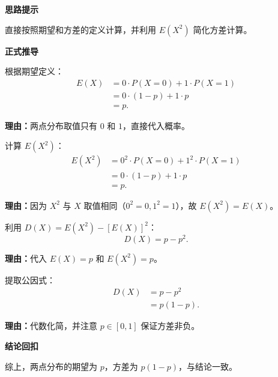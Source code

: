 \begin{proofbox}

	\textbf{\textcolor{CProof}{思路提示}}

	直接按照期望和方差的定义计算，并利用 $E(X^2)$ 简化方差计算。

	\medskip
	\textbf{\textcolor{CProof}{正式推导}}
	\begin{description}[style=nextline, leftmargin=2.8em, labelsep=0.5em, itemsep=0.55em]

		\item[\textbf{步骤一（求期望）：}] 根据期望定义：
			\[
				\begin{aligned}
					E(X) &= 0\cdot P(X=0) + 1\cdot P(X=1) \\
					&= 0\cdot(1-p) + 1\cdot p \\
					&= p.
			\end{aligned}
			\]
			\par\textbf{理由：}两点分布取值只有 $0$ 和 $1$，直接代入概率。

		\item[\textbf{步骤二（求二阶矩）：}] 计算 $E(X^2)$：
			\[
				\begin{aligned}
					E(X^2) &= 0^2\cdot P(X=0) + 1^2\cdot P(X=1) \\
					&= 0\cdot(1-p) + 1\cdot p \\
					&= p.
			\end{aligned}
			\]
			\par\textbf{理由：}因为 $X^2$ 与 $X$ 取值相同（$0^2=0,1^2=1$），故 $E(X^2)=E(X)$。

		\item[\textbf{步骤三（方差公式）：}] 利用 $D(X)=E(X^2)-[E(X)]^2$：
			\[
				D(X)=p-p^2.
			\]
			\par\textbf{理由：}代入 $E(X)=p$ 和 $E(X^2)=p$。

		\item[\textbf{步骤四（化简得结论）：}] 提取公因式：
			\[
				\begin{aligned}
					D(X) &= p-p^2 \\
					&= p(1-p).
			\end{aligned}
			\]
			\par\textbf{理由：}代数化简，并注意 $p\in[0,1]$ 保证方差非负。

	\end{description}

	\medskip
	\textbf{\textcolor{CProof}{结论回扣}}

	综上，两点分布的期望为 $p$，方差为 $p(1-p)$，与结论一致。
\end{proofbox}
